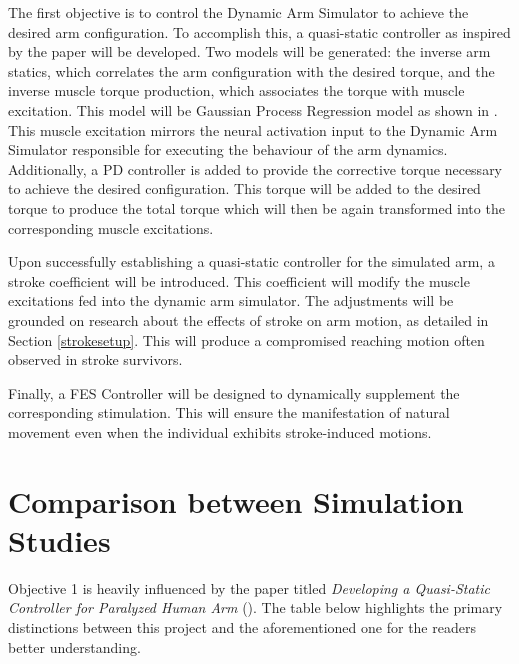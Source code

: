 The first objective is to control the Dynamic Arm Simulator to achieve the desired arm configuration. To accomplish this, a quasi-static controller as inspired by the paper \cite{QSC} will be developed. Two models will be generated: the inverse arm statics, which correlates the arm configuration with the desired torque, and the inverse muscle torque production, which associates the torque with muscle excitation. This model will be Gaussian Process Regression model as shown in \cite{QSC}. This muscle excitation mirrors the neural activation input to the Dynamic Arm Simulator responsible for executing the behaviour of the arm dynamics. Additionally, a PD controller is added to provide the corrective torque necessary to achieve the desired configuration. This torque will be added to the desired torque to produce the total torque which will then be again transformed into the corresponding muscle excitations. 

Upon successfully establishing a quasi-static controller for the simulated arm, a stroke coefficient will be introduced. This coefficient will modify the muscle excitations fed into the dynamic arm simulator. The adjustments will be grounded on research about the effects of stroke on arm motion, as detailed in Section \ref{strokesetup}. This will produce a compromised reaching motion often observed in stroke survivors.

Finally, a FES Controller will be designed to dynamically supplement the corresponding stimulation. This will ensure the manifestation of natural movement even when the individual exhibits stroke-induced motions.




\section{ Comparison between Simulation Studies}

Objective 1 is heavily influenced by the paper titled \textit{Developing a Quasi-Static Controller for Paralyzed Human Arm} (\cite{QSC}). The table below highlights the primary distinctions between this project and the aforementioned one for the readers better understanding. 

